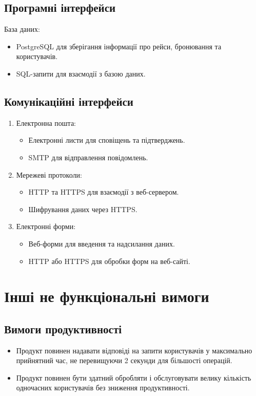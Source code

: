 \documentclass[14pt]{extreport}
\begin{document}
\begin{normalsize}
	\subsection*{Програмні інтерфейси}
	База даних:
	\begin{itemize}
		\item PostgreSQL для зберігання інформації про рейси, бронювання та користувачів.
		\item SQL-запити для взаємодії з базою даних.
	\end{itemize}
	
	\subsection*{Комунікаційні інтерфейси}
	\begin{enumerate}
		\item Електронна пошта:\begin{itemize}
			\item Електронні листи для сповіщень та підтверджень.
			\item SMTP для відправлення повідомлень.
		\end{itemize}
		\item Мережеві протоколи: \begin{itemize}
			\item HTTP та HTTPS для взаємодії з веб-сервером.
			\item Шифрування даних через HTTPS.
		\end{itemize}
		\item Електронні форми: \begin{itemize}
			\item Веб-форми для введення та надсилання даних.
			\item HTTP або HTTPS для обробки форм на веб-сайті.
		\end{itemize}
	\end{enumerate}

	\section*{Інші не функціональні вимоги}
	\subsection*{Вимоги продуктивності}
	\begin{itemize}
		\item Продукт повинен надавати відповіді на запити користувачів у максимально прийнятний час, не перевищуючи 2 секунди для більшості операцій.
		\item Продукт повинен бути здатний обробляти і обслуговувати велику кількість одночасних користувачів без зниження продуктивності.
	\end{itemize}
	

\end{normalsize}
\end{document}
